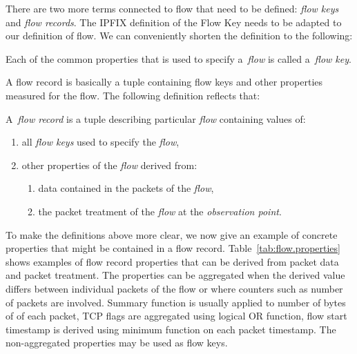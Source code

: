 There are two more terms connected to flow that need to be defined: \emph{flow keys} and \emph{flow records}. The IPFIX definition of the Flow Key needs to be adapted to our definition of flow. We can conveniently shorten the definition to the following:

\begin{definition}\label{def:flow-key}

    Each of the common properties that is used to specify a~\emph{flow} is called a~\emph{flow key}.

\end{definition}

A flow record is basically a tuple containing flow keys and other properties measured for the flow. The following definition reflects that:

\begin{definition}\label{def:flow-record}

    A~\emph{flow record} is a tuple describing particular \emph{flow} containing values of:

    \begin{enumerate}
    	\item all \emph{flow keys} used to specify the \emph{flow},
    	\item other properties of the \emph{flow} derived from:
    	\begin{enumerate}
    		\item data contained in the packets of the \emph{flow},
    		\item the packet treatment of the \emph{flow} at the \emph{observation point}.
    	\end{enumerate}
    \end{enumerate}

\end{definition}

To make the definitions above more clear, we now give an example of concrete properties that might be contained in a flow record. Table~\ref{tab:flow.properties} shows examples of flow record properties that can be derived from packet data and packet treatment. The properties can be aggregated when the derived value differs between individual packets of the flow or where counters such as number of packets are involved. Summary function is usually applied to number of bytes of of each packet, TCP flags are aggregated using logical OR function, flow start timestamp is derived using minimum function on each packet timestamp. The non-aggregated properties may be used as flow keys.

